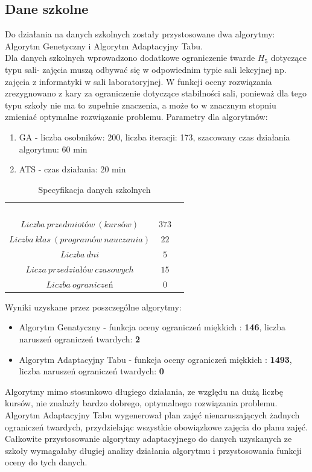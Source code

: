 \subsection{Dane szkolne}
Do działania na danych szkolnych zostały przystosowane dwa algorytmy: Algorytm Genetyczny i Algorytm Adaptacyjny Tabu. \\
Dla danych szkolnych wprowadzono dodatkowe ograniczenie twarde ${H_{5}}$ dotyczące typu sali- zajęcia muszą odbywać się w odpowiednim typie sali lekcyjnej np. zajęcia z informatyki w sali laboratoryjnej. W funkcji oceny rozwiązania zrezygnowano z kary za ograniczenie dotyczące stabilności sali, ponieważ dla tego typu szkoły nie ma to zupełnie znaczenia, a może to w znacznym stopniu zmieniać optymalne rozwiązanie problemu.
Parametry dla algorytmów:
\begin{enumerate}
\item GA - liczba osobników: 200, liczba iteracji: 173, szacowany czas działania algorytmu: 60 min
\item ATS - czas działania: 20 min
\end{enumerate}

\begin{table}[H]
\begin{center}
\begin{tabular}{ |c|c|c| }
\multicolumn{1}{r}{}
 &  \multicolumn{1}{c}{$$}
 & \multicolumn{1}{c}{$$} 
 \\
\cline{1-2}
$Liczba\ przedmiotów\ (kursów)$ & $373$\\
\cline{1-2}
$Liczba\ klas\ (programów\ nauczania)$ & $22$\\
\cline{1-2}
$Liczba\ dni$ & $5$ \\
\cline{1-2}
$Licza\ przedziałów\ czasowych$ & $15$ \\
\cline{1-2}
$Liczba\ ograniczeń$ & $0$ \\
\cline{1-2}
\end{tabular}
\end{center}
\caption {Specyfikacja danych szkolnych}
\end{table}
Wyniki uzyskane przez poszczególne algorytmy:
\begin{itemize}
\item Algorytm Genatyczny - funkcja oceny ograniczeń miękkich : \textbf{146}, liczba naruszeń ograniczeń twardych: \textbf{2}
\item Algorytm Adaptacyjny Tabu - funkcja oceny ograniczeń miękkich : \textbf{1493}, liczba naruszeń ograniczeń twardych: \textbf{0}
\end{itemize}
Algorytmy mimo stosunkowo długiego działania, ze względu na dużą liczbę kursów, nie znalazły bardzo dobrego, optymalnego rozwiązania problemu. Algorytm Adaptacyjny Tabu wygenerował plan zajęć nienaruszających żadnych ograniczeń twardych, przydzielając wszystkie obowiązkowe zajęcia do planu zajęć. Całkowite przystosowanie algorytmy adaptacyjnego do danych uzyskanych ze szkoły wymagałaby długiej analizy działania algorytmu i przystosowania funkcji oceny do tych danych.


